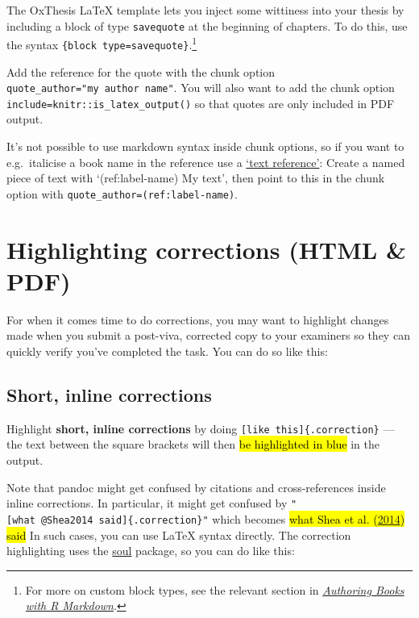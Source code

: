 \documentclass[a4paper, nobind]{templates/ociamthesis}
\begin{document}
The OxThesis LaTeX template lets you inject some wittiness into your thesis by including a block of type \texttt{savequote} at the beginning of chapters.
To do this, use the syntax \texttt{\textasciigrave{}\textasciigrave{}\textasciigrave{}\{block\ type=\textquotesingle{}savequote\textquotesingle{}\}}.\footnote{For more on custom block types, see the relevant section in \href{https://bookdown.org/yihui/bookdown/custom-blocks.html}{\emph{Authoring Books with R Markdown}}.}

Add the reference for the quote with the chunk option \texttt{quote\_author="my\ author\ name"}.
You will also want to add the chunk option \texttt{include=knitr::is\_latex\_output()} so that quotes are only included in PDF output.

It's not possible to use markdown syntax inside chunk options, so if you want to e.g.~italicise a book name in the reference use a \href{https://bookdown.org/yihui/bookdown/markdown-extensions-by-bookdown.html\#text-references}{`text reference'}: Create a named piece of text with `(ref:label-name) My text', then point to this in the chunk option with \texttt{quote\_author=\textquotesingle{}(ref:label-name)\textquotesingle{}}.

\hypertarget{highlighting-corrections-html-pdf}{%
\section{Highlighting corrections (HTML \& PDF)}\label{highlighting-corrections-html-pdf}}

For when it comes time to do corrections, you may want to highlight changes made when you submit a post-viva, corrected copy to your examiners so they can quickly verify you've completed the task.
You can do so like this:

\hypertarget{short-inline-corrections}{%
\subsection{Short, inline corrections}\label{short-inline-corrections}}

Highlight \textbf{short, inline corrections} by doing \texttt{{[}like\ this{]}\{.correction\}} --- the text between the square brackets will then \hl{be highlighted in blue} in the output.

Note that pandoc might get confused by citations and cross-references inside inline corrections.
In particular, it might get confused by \texttt{"{[}what\ @Shea2014\ said{]}\{.correction\}"} which becomes \hl{what Shea et al. (\protect\hyperlink{ref-Shea2014}{2014}) said}
In such cases, you can use LaTeX syntax directly.
The correction highlighting uses the \href{https://ctan.org/pkg/soul}{soul} package, so you can do like this:
\end{document}
